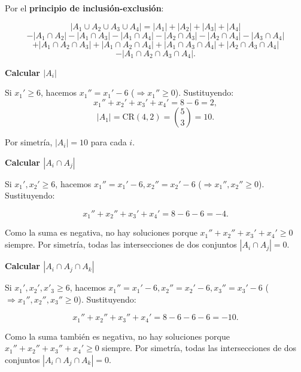 \documentclass[a4paper,12pt]{article}
\begin{document}
\begin{ejercicio}[title=Ejercicio 36]

Por el \textbf{principio de inclusión-exclusión}:

\[
|A_1 \cup A_2 \cup A_3 \cup A_4|
= |A_1| + |A_2| + |A_3| + |A_4|
\]
\[
- |A_1 \cap A_2| - |A_1 \cap A_3| - |A_1 \cap A_4|
- |A_2 \cap A_3| - |A_2 \cap A_4| - |A_3 \cap A_4|
\]
\[
+ |A_1 \cap A_2 \cap A_3|
+ |A_1 \cap A_2 \cap A_4|
+ |A_1 \cap A_3 \cap A_4|
+ |A_2 \cap A_3 \cap A_4|
\]
\[
- |A_1 \cap A_2 \cap A_3 \cap A_4|.
\]

\vspace{2em}

\textbf{Calcular \(|A_i|\)}

Si \(x_1'\ge 6\), hacemos \(x_1'' = x_1'-6\) (\(\Rightarrow x_1''\ge 0\)). Sustituyendo:
\[
x_1'' + x_2' + x_3' + x_4' = 8-6 = 2,
\]
\[
|A_1| = \mathrm{CR}(4,2) = \binom{5}{3} = 10.
\]

Por simetría, \(|A_i| = 10\) para cada \(i\).

\vspace{2em}

\textbf{Calcular \(|A_i \cap A_j|\)}

Si \(x_1', x_2' \ge 6\), hacemos \(x_1'' = x_1'-6, x_2'' = x_2'-6\) (\(\Rightarrow x_1'', x_2'' \ge 0\)). Sustituyendo:

\[
x_1'' + x_2'' + x_3' + x_4' = 8 - 6 - 6 = -4.
\]

\vspace{0.5em}

Como la suma es negativa, no hay soluciones porque $x_1'' + x_2'' + x_3' + x_4' \ge 0$ siempre. Por simetría, todas las intersecciones de dos conjuntos \(|A_i \cap A_j| = 0\).

\vspace{2em}

\textbf{Calcular \(|A_i \cap A_j \cap A_k|\)}

Si \(x_1', x_2', x'_3 \ge 6\), hacemos \(x_1'' = x_1'-6, x_2'' = x_2'-6,  x_3'' = x_3'-6\) (\(\Rightarrow x_1'', x_2'', x_3'' \ge 0\)). Sustituyendo:

\[
x_1'' + x_2'' + x_3'' + x_4' = 8 - 6 - 6 - 6 = -10.
\]

\vspace{0.5em}

Como la suma también es negativa, no hay soluciones porque $x_1'' + x_2'' + x_3'' + x_4' \ge 0$ siempre. Por simetría, todas las intersecciones de dos conjuntos \(|A_i \cap A_j \cap A_k| = 0\).

\vspace{2em}


\end{ejercicio}
\end{document}
